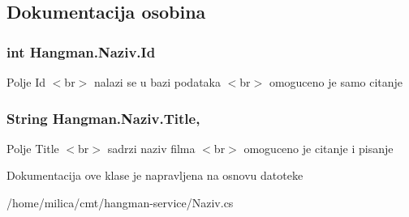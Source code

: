\subsection{Dokumentacija osobina}
\hypertarget{classHangman_1_1Naziv_acddaa116b6ae56bfb512340d2856f4ce}{}
\subsubsection[{Id}]{\setlength{\rightskip}{0pt plus 5cm}int Hangman.\+Naziv.\+Id\hspace{0.3cm}{\ttfamily [get]}}\label{classHangman_1_1Naziv_acddaa116b6ae56bfb512340d2856f4ce}
Polje Id $<$br$>$ nalazi se u bazi podataka $<$br$>$ omoguceno je samo citanje \hypertarget{classHangman_1_1Naziv_aa98229e64e469c9c6add0bb41a1447b0}{}
\subsubsection[{Title}]{\setlength{\rightskip}{0pt plus 5cm}String Hangman.\+Naziv.\+Title\hspace{0.3cm}{\ttfamily [get]}, {\ttfamily [set]}}\label{classHangman_1_1Naziv_aa98229e64e469c9c6add0bb41a1447b0}
Polje Title $<$br$>$ sadrzi naziv filma $<$br$>$ omoguceno je citanje i pisanje 

Dokumentacija ove klase je napravljena na osnovu datoteke \begin{DoxyCompactItemize}
\item 
/home/milica/cmt/hangman-\/service/Naziv.\+cs\end{DoxyCompactItemize}
